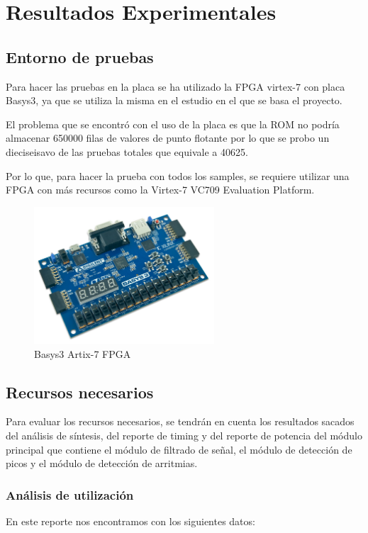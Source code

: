 \chapter{Resultados Experimentales}


\section{Entorno de pruebas}
Para hacer las pruebas en la placa se ha utilizado la FPGA virtex-7 con placa Basys3, ya que se utiliza la misma en el estudio en el que se basa el proyecto\cite{desai2021low}.

El problema que se encontró con el uso de la placa es que la ROM no podría almacenar 650000 filas de valores de punto flotante por lo que se probo un dieciseisavo de las pruebas totales que equivale a 40625.

Por lo que, para hacer la prueba con todos los samples, se requiere utilizar una FPGA con más recursos como la Virtex-7 VC709 Evaluation Platform.

\begin{figure}[h]
	\centering
	\includegraphics[width=0.6\textwidth]{./Images/img_introduccion/Basys3.jpg}
	\caption{Basys3 Artix-7 FPGA}
	\label{fig:Basys3}
\end{figure}

\section{Recursos necesarios}
	Para evaluar los recursos necesarios, se tendrán en cuenta los resultados sacados del análisis de síntesis, del reporte de timing y del reporte de potencia del módulo principal que contiene el módulo de filtrado de señal,
	el módulo de detección de picos y el módulo de detección de arritmias. 
	
\subsection{Análisis de utilización}
En este reporte nos encontramos con los siguientes datos:


